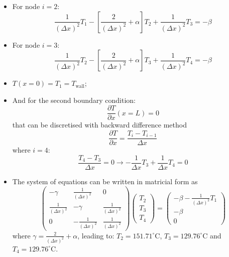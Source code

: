 \documentclass[12pts,a4paper,amsmath,amssymb,floatfix]{article}%
\newcommand{\frc}{\displaystyle\frac}
\begin{document}
\begin{itemize}
\item For node $i=2$:
\begin{displaymath}
\frc{1}{\left(\Delta x\right)^{2}} T_{1}-\left[\frc{2}{\left(\Delta x\right)^{2}} +\alpha\right]T_{2} + \frc{1}{\left(\Delta x\right)^{2}}T_{3}=-\beta
\end{displaymath}
\item For node $i=3$:
\begin{displaymath}
\frc{1}{\left(\Delta x\right)^{2}} T_{2}-\left[\frc{2}{\left(\Delta x\right)^{2}} +\alpha\right]T_{3} + \frc{1}{\left(\Delta x\right)^{2}}T_{4}=-\beta
\end{displaymath}
\item $T\left(x=0\right)=T_{1}=T_{\text{wall}}$;
\item And for the second boundary condition:
\begin{displaymath}
\frc{\partial T}{\partial x}\left(x=L\right)=0
\end{displaymath}
that can be discretised with backward difference method
\begin{displaymath}
\frc{\partial T}{\partial x} = \frc{T_{i}-T_{i-1}}{\Delta x}
\end{displaymath}
where $i=4$:
\begin{displaymath}
\frc{T_{4}-T_{3}}{\Delta x} = 0 \rightarrow -\frc{1}{\Delta x}T_{3} +\frc{1}{\Delta x}T_{4} = 0 
\end{displaymath}
\item The system of equations can be written in matricial form as
\begin{displaymath}
  \begin{pmatrix}
   -\gamma                            & \frc{1}{\left(\Delta x\right)^{2}} & 0 \\ 
   \frc{1}{\left(\Delta x\right)^{2}}  & -\gamma & \frc{1}{\left(\Delta x\right)^{2}} \\
   0 & -\frc{1}{\left(\Delta x\right)^{2}} & \frc{1}{\left(\Delta x\right)^{2}}
  \end{pmatrix}
  \begin{pmatrix}
    T_{2} \\ T_{3} \\ T_{4}
  \end{pmatrix}=
  \begin{pmatrix}
   -\beta -\frc{1}{\left(\Delta x\right)^{2}}T_{1} \\
   -\beta \\
   0
  \end{pmatrix}
\end{displaymath}
where $\gamma =  \frc{2}{\left(\Delta x\right)^{2}} + \alpha$, leading to:
$T_{2}=151.71^{\circ}$C, $T_{3}=129.76^{\circ}$C and $T_{4}=129.76^{\circ}$C.
\end{itemize}
\end{document}
